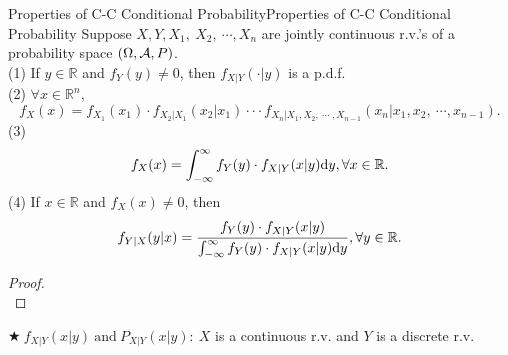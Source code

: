 \documentclass{elegantbook}
\begin{document}
\begin{theorem}{Properties of C-C Conditional Probability}{Properties of C-C Conditional Probability}
Suppose \(X,Y,X_{1},\ X_{2},\ \cdots,X_{n}\) are jointly continuous r.v.'s of a probability space $(\Omega,\mathcal{A}, P)$.\\
(1) If \(y \in \mathbb{R}\) and \(f_{Y}(y) \neq 0\), then \(f_{X|Y}\left( \cdot | y \right)\) is a p.d.f.\\
(2) $\forall x \in \mathbb{R}^{n}$,
\[f_{X}(x) = f_{X_{1}}(x_{1}) \cdot f_{X_{2}|X_{1}}\left( x_{2}|x_{1} \right) \cdot \cdot \cdot f_{X_{n}|X_{1},X_{2},\ \cdots\ ,X_{n - 1}}\left( x_{n}|x_{1},x_{2},\ \cdots,x_{n - 1} \right).\]
(3)
\[f_{X}(x) = \int_{- \infty}^{\infty}{f_{Y}(y) \cdot f_{X|Y}(x|y)}\dif y,\forall x \in \mathbb{R}.\]
(4) If \(x \in \mathbb{R}\) and \(f_{X}(x) \neq 0\), then
\[f_{Y|X}(y|x) = \frac{f_{Y}(y) \cdot f_{X|Y}(x|y)}{\int_{- \infty}^{\infty}{f_{Y}(y) \cdot f_{X|Y}(x|y)\dif y}},\forall y \in \mathbb{R}.\]
\end{theorem}

\begin{proof}
\\[4cm]\vspace{0.01cm}
\end{proof}

\(\bigstar\ f_{X|Y}(x|y)\ \mathrm{\text{and}}\ P_{X|Y}(x|y):\ X\) is a continuous r.v. and \(Y\) is a discrete r.v.
\end{document}
